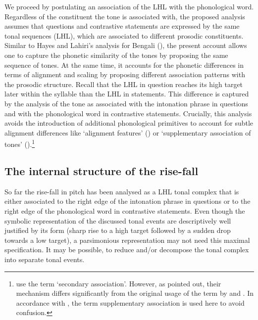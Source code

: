 We proceed by postulating an association of the LHL with the phonological word. Regardless of the constituent the tone is associated with, the proposed analysis assumes that questions and contrastive statements are expressed by the same tonal sequences (LHL), which are associated to different prosodic constituents. Similar to Hayes and Lahiri’s analysis for Bengali (\citeyear{HayesLahiri1991}), the present account allows one to capture the phonetic similarity of the tones by proposing the same sequence of tones. At the same time, it accounts for the phonetic differences in terms of alignment and scaling by proposing different association patterns with the prosodic structure. Recall that the LHL in question reaches its high target later within the syllable than the LHL in statements. This difference is captured by the analysis of the tone as associated with the intonation phrase in questions and with the phonological word in contrastive statements. Crucially, this analysis avoids the introduction of additional phonological primitives to account for subtle alignment differences like ‘alignment features’ (\citealt{Remijsen2013}) or ‘supplementary association of tones’ (\citealt{Prieto.etal2005,FacePrieto2007}).\footnote{\citet{Prieto.etal2005} use the term ‘secondary association’. However, as \citet{Arvaniti.etal2006} pointed out, their mechanism differs significantly from the original usage of the term by \citet{PierrBeck1988} and \citet{Grice.etal2000}. In accordance with \citet{Arvaniti.etal2006}, the term supplementary association is used here to avoid confusion.}

\subsection{The internal structure of the rise-fall}
So far the rise-fall in pitch has been analysed as a LHL tonal complex that is either associated to the right edge of the intonation phrase in questions or to the right edge of the phonological word in contrastive statements. Even though the symbolic representation of the discussed tonal events are descriptively well justified by its form (sharp rise to a high target followed by a sudden drop towards a low target), a parsimonious representation may not need this maximal specification. It may be possible, to reduce and/or decompose the tonal complex into separate tonal events. 

